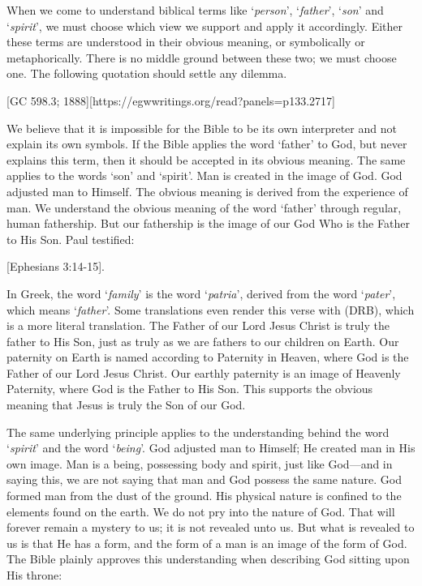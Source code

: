 When we come to understand biblical terms like ‘\textit{person}’, ‘\textit{father}’, ‘\textit{son}’ and ‘\textit{spirit}’, we must choose which view we support and apply it accordingly. Either these terms are understood in their obvious meaning, or symbolically or metaphorically. There is no middle ground between these two; we must choose one. The following quotation should settle any dilemma.

[GC 598.3; 1888][https://egwwritings.org/read?panels=p133.2717]

We believe that it is impossible for the Bible to be its own interpreter and not explain its own symbols. If the Bible applies the word ‘father’ to God, but never explains this term, then it should be accepted in its obvious meaning. The same applies to the words ‘son’ and ‘spirit’. Man is created in the image of God. God adjusted man to Himself. The obvious meaning is derived from the experience of man. We understand the obvious meaning of the word ‘father’ through regular, human fathership. But our fathership is the image of our God Who is the Father to His Son. Paul testified:

[Ephesians 3:14-15].

In Greek, the word ‘\textit{family}’ is the word ‘\textit{patria}’, derived from the word ‘\textit{pater}’, which means ‘\textit{father}’. Some translations even render this verse with  (DRB), which is a more literal translation. The Father of our Lord Jesus Christ is truly the father to His Son, just as truly as we are fathers to our children on Earth. Our paternity on Earth is named according to Paternity in Heaven, where God is the Father of our Lord Jesus Christ. Our earthly paternity is an image of Heavenly Paternity, where God is the Father to His Son. This supports the obvious meaning that Jesus is truly the Son of our God.

The same underlying principle applies to the understanding behind the word ‘\textit{spirit}’ and the word ‘\textit{being}’. God adjusted man to Himself; He created man in His own image. Man is a being, possessing body and spirit, just like God—and in saying this, we are not saying that man and God possess the same nature. God formed man from the dust of the ground. His physical nature is confined to the elements found on the earth. We do not pry into the nature of God. That will forever remain a mystery to us; it is not revealed unto us. But what is revealed to us is that He has a form, and the form of a man is an image of the form of God. The Bible plainly approves this understanding when describing God sitting upon His throne:

